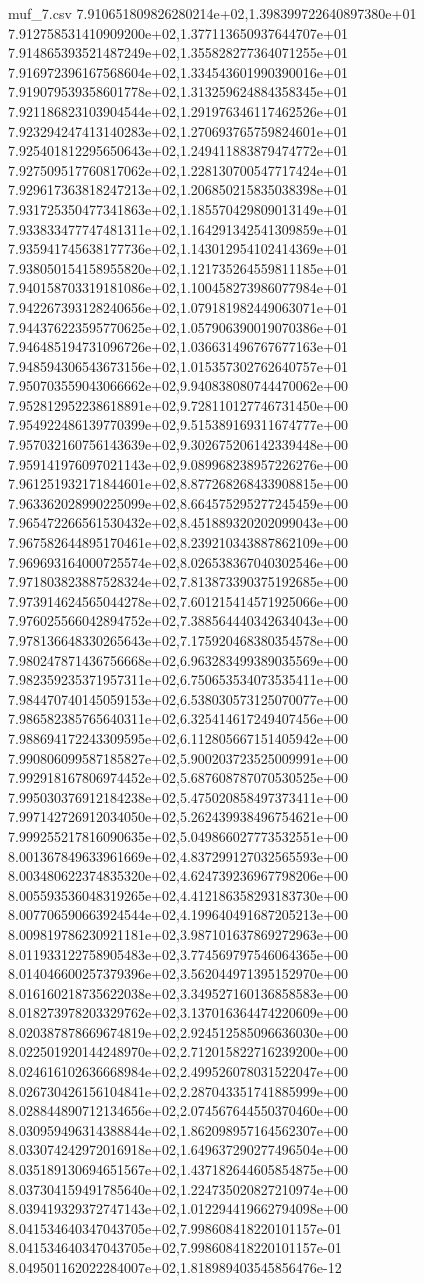 \begin{filecontents*}{muf_7.csv}
7.910651809826280214e+02,1.398399722640897380e+01
7.912758531410909200e+02,1.377113650937644707e+01
7.914865393521487249e+02,1.355828277364071255e+01
7.916972396167568604e+02,1.334543601990390016e+01
7.919079539358601778e+02,1.313259624884358345e+01
7.921186823103904544e+02,1.291976346117462526e+01
7.923294247413140283e+02,1.270693765759824601e+01
7.925401812295650643e+02,1.249411883879474772e+01
7.927509517760817062e+02,1.228130700547717424e+01
7.929617363818247213e+02,1.206850215835038398e+01
7.931725350477341863e+02,1.185570429809013149e+01
7.933833477747481311e+02,1.164291342541309859e+01
7.935941745638177736e+02,1.143012954102414369e+01
7.938050154158955820e+02,1.121735264559811185e+01
7.940158703319181086e+02,1.100458273986077984e+01
7.942267393128240656e+02,1.079181982449063071e+01
7.944376223595770625e+02,1.057906390019070386e+01
7.946485194731096726e+02,1.036631496767677163e+01
7.948594306543673156e+02,1.015357302762640757e+01
7.950703559043066662e+02,9.940838080744470062e+00
7.952812952238618891e+02,9.728110127746731450e+00
7.954922486139770399e+02,9.515389169311674777e+00
7.957032160756143639e+02,9.302675206142339448e+00
7.959141976097021143e+02,9.089968238957226276e+00
7.961251932171844601e+02,8.877268268433908815e+00
7.963362028990225099e+02,8.664575295277245459e+00
7.965472266561530432e+02,8.451889320202099043e+00
7.967582644895170461e+02,8.239210343887862109e+00
7.969693164000725574e+02,8.026538367040302546e+00
7.971803823887528324e+02,7.813873390375192685e+00
7.973914624565044278e+02,7.601215414571925066e+00
7.976025566042894752e+02,7.388564440342634043e+00
7.978136648330265643e+02,7.175920468380354578e+00
7.980247871436756668e+02,6.963283499389035569e+00
7.982359235371957311e+02,6.750653534073535411e+00
7.984470740145059153e+02,6.538030573125070077e+00
7.986582385765640311e+02,6.325414617249407456e+00
7.988694172243309595e+02,6.112805667151405942e+00
7.990806099587185827e+02,5.900203723525009991e+00
7.992918167806974452e+02,5.687608787070530525e+00
7.995030376912184238e+02,5.475020858497373411e+00
7.997142726912034050e+02,5.262439938496754621e+00
7.999255217816090635e+02,5.049866027773532551e+00
8.001367849633961669e+02,4.837299127032565593e+00
8.003480622374835320e+02,4.624739236967798206e+00
8.005593536048319265e+02,4.412186358293183730e+00
8.007706590663924544e+02,4.199640491687205213e+00
8.009819786230921181e+02,3.987101637869272963e+00
8.011933122758905483e+02,3.774569797546064365e+00
8.014046600257379396e+02,3.562044971395152970e+00
8.016160218735622038e+02,3.349527160136858583e+00
8.018273978203329762e+02,3.137016364474220609e+00
8.020387878669674819e+02,2.924512585096636030e+00
8.022501920144248970e+02,2.712015822716239200e+00
8.024616102636668984e+02,2.499526078031522047e+00
8.026730426156104841e+02,2.287043351741885999e+00
8.028844890712134656e+02,2.074567644550370460e+00
8.030959496314388844e+02,1.862098957164562307e+00
8.033074242972016918e+02,1.649637290277496504e+00
8.035189130694651567e+02,1.437182644605854875e+00
8.037304159491785640e+02,1.224735020827210974e+00
8.039419329372747143e+02,1.012294419662794098e+00
8.041534640347043705e+02,7.998608418220101157e-01
8.041534640347043705e+02,7.998608418220101157e-01
8.049501162022284007e+02,1.818989403545856476e-12
\end{filecontents*}

